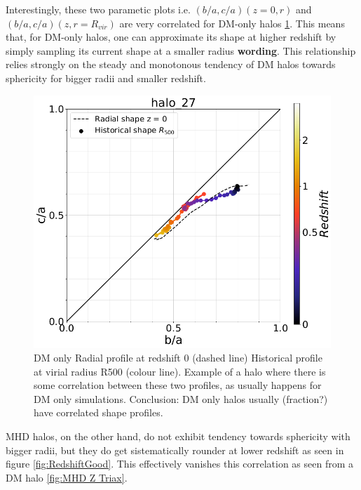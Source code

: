 \documentclass[a4paper,fleqn,usenatbib]{mnras}
\begin{document}
Interestingly, these two parametic plots i.e. $(b/a,c/a)(z=0,r)$ and
$(b/a,c/a)(z,r=R_{vir})$ are very correlated for DM-only halos
\ref{fig:DM Z Triax}. This means that, for DM-only halos, one can
approximate its shape at higher redshift by simply sampling its
current shape at a smaller radius \textbf{wording}. This relationship
relies strongly on the steady and monotonous tendency of DM halos
towards sphericity for bigger radii and smaller redshift. 


\begin{figure}
  \includegraphics[width=\columnwidth]{./pics/Redshift/halo_27_DM_Z_correlation.png}
  \caption{DM only Radial profile at redshift 0 (dashed line)
    Historical profile at virial radius R500 (colour line). Example
    of a halo where there is some correlation between these two
    profiles, as usually happens for DM only
    simulations. Conclusion: DM only halos usually (fraction?) have
    correlated shape profiles.} 
  \label{fig:DM Z Triax}
\end{figure}

MHD halos, on the other hand, do not exhibit tendency towards
sphericity with bigger radii, but they do get sistematically rounder
at lower redshift as seen in figure \ref{fig:RedshiftGood}. This
effectively vanishes this correlation as seen from a DM halo
\ref{fig:MHD Z Triax}. 
\end{document}
